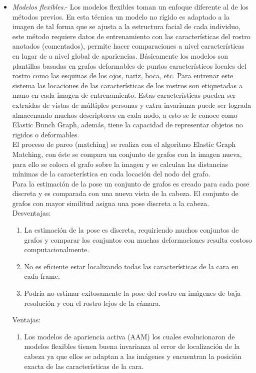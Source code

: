 \begin{itemize}
   	\item \textit{Modelos flexibles}.- Los modelos flexibles toman un enfoque diferente al de los métodos previos. En esta técnica un modelo no rígido es adaptado a la imagen de tal forma que se ajusta a la estructura facial de cada individuo, este método requiere datos de entrenamiento con las características del rostro anotados (comentados), permite hacer comparaciones a nivel características en lugar de a nivel global de apariencias. Básicamente los modelos son plantillas basadas en grafos deformables de puntos característicos locales del rostro como las esquinas de los ojos, nariz, boca, etc. Para entrenar este sistema las locaciones de las características de los rostros son etiquetadas a mano en cada imagen de entrenamiento. Estas características pueden ser extraídas de vistas de múltiples personas y extra invarianza puede ser lograda almacenando muchos descriptores en cada nodo, a esto se le conoce como Elastic Bunch Graph, además, tiene la capacidad de representar objetos no rigidos o deformables. \\
   	El proceso de pareo (matching) se realiza con el algoritmo Elastic Graph Matching, con éste se compara un conjunto de grafos con la imagen nueva, para ello se coloca el grafo sobre la imagen y se calculan las distancias mínimas de la característica en cada locación del nodo del grafo. \\
   	Para la estimación de la pose un conjunto de grafos es creado para cada pose discreta y es comparada con una nueva vista de la cabeza. El conjunto de grafos con mayor similitud asigna una pose discreta a la cabeza.
   	\\Desventajas:
   	\begin{enumerate}[label=(\alph*)]
   		\item La estimación de la pose es discreta, requiriendo muchos conjuntos de grafos y comparar los conjuntos con muchas deformaciones resulta costoso computacionalmente.
   		\item No es eficiente estar localizando todas las características de la cara en cada frame.
   		\item Podría no estimar exitosamente la pose del rostro en imágenes de baja resolución y con el rostro lejos de la cámara.
   	\end{enumerate}
   	
   	Ventajas:
   	\begin{enumerate}[label=(\alph*)]
   		\item  Los modelos de apariencia activa (AAM) los cuales evolucionaron de modelos flexibles tienen buena invarianza al error de localización de la cabeza ya que ellos se adaptan a las imágenes y encuentran la posición exacta de las características de la cara.
   	\end{enumerate}
   	

\end{itemize}
